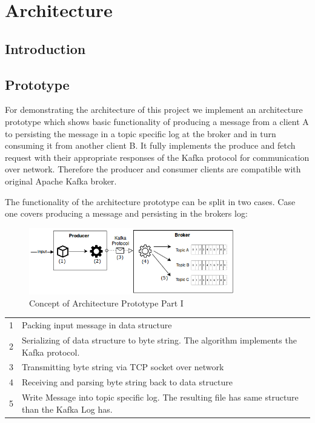 \chapter{Architecture}

\section{Introduction}

\section{Prototype}
For demonstrating the architecture of this project we implement an architecture
prototype which shows basic functionality of producing a message from a client A
to persisting the message in a  topic specific log at the broker and in turn consuming it from another
client B. It fully implements the produce and fetch request with their
appropriate responses of the Kafka protocol for communication over network.
Therefore the producer and consumer clients are compatible with original Apache
Kafka broker.

The functionality of the architecture prototype can be split in two cases.
Case one covers producing a message and persisting in the brokers log:
\begin{figure}[H]
    \centering
    \includegraphics[width=0.8\textwidth]{images/concept_producer.png}
    \caption{Concept of Architecture Prototype Part I}
    \label{fig:conept-producer}
\end{figure}

\begin{table}[h]
\begin{tabular}{ll}
1  & Packing input message in data structure                                                          \\
2  & Serializing of data structure to byte string. The algorithm implements the Kafka protocol.       \\
3 & Transmitting byte string via TCP socket over network                                             \\
4  & Receiving and parsing byte string back to data structure                                         \\
5   & Write Message into topic specific log. The resulting file has same structure than the Kafka Log has.
\end{tabular}
\end{table}

